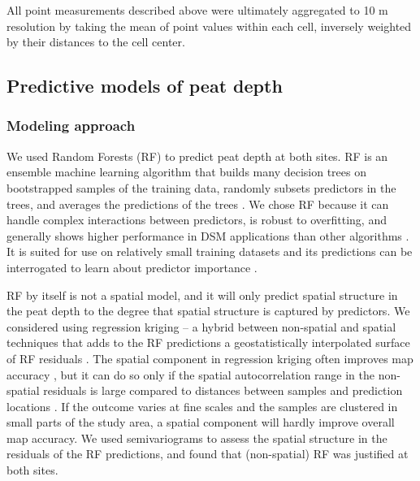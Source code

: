 \documentclass[soil, manuscript]{copernicus}
\begin{document}
All point measurements described above \citep{volleringPeatDepthOccurrence2025} were ultimately aggregated to 10 m resolution by taking the mean of point values within each cell, inversely weighted by their distances to the cell center.

\subsection{Predictive models of peat depth}

\subsubsection{Modeling approach}

We used Random Forests (RF) to predict peat depth at both sites.
RF is an ensemble machine learning algorithm that builds many decision trees on bootstrapped samples of the training data, randomly subsets predictors in the trees, and averages the predictions of the trees \citep{breimanRandomForests2001}.
We chose RF because it can handle complex interactions between predictors, is robust to overfitting, and generally shows higher performance in DSM applications than other algorithms \citep{beguinPredictingSoilProperties2017, nussbaumEvaluationDigitalSoil2018, lamichhaneDigitalSoilMapping2019}.
It is suited for use on relatively small training datasets and its predictions can be interrogated to learn about predictor importance \citep{khaledianSelectingAppropriateMachine2020}.

RF by itself is not a spatial model, and it will only predict spatial structure in the peat depth to the degree that spatial structure is captured by predictors.
We considered using regression kriging -- a hybrid between non-spatial and spatial techniques that adds to the RF predictions a geostatistically interpolated surface of RF residuals \citep{henglGenericFrameworkSpatial2004}.
The spatial component in regression kriging often improves map accuracy \citep{beguinPredictingSoilProperties2017, lamichhaneDigitalSoilMapping2019, mollaMachineLearningGeostatistical2023}, but it can do so only if the spatial autocorrelation range in the non-spatial residuals is large compared to distances between samples and prediction locations \citep{henglGenericFrameworkSpatial2004, szaboMappingSoilHydraulic2019, takoutsingComparingPredictionPerformance2022}.
If the outcome varies at fine scales and the samples are clustered in small parts of the study area, a spatial component will hardly improve overall map accuracy.
We used semivariograms to assess the spatial structure in the residuals of the RF predictions, and found that (non-spatial) RF was justified at both sites.
\end{document}
